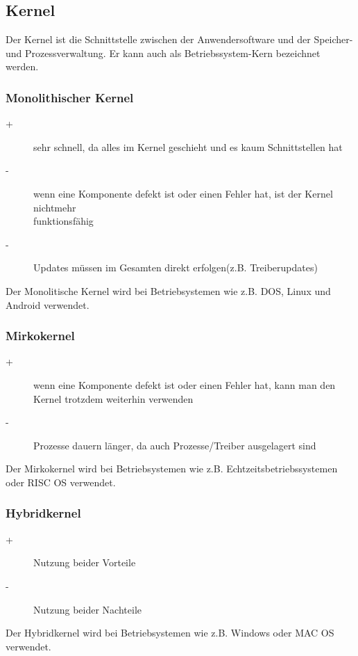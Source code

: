 \documentclass[12pt,a4paper]{article}
\begin{document}
\subsection{Kernel}
    Der Kernel ist die Schnittstelle zwischen der Anwendersoftware und der Speicher- und Prozessverwaltung. Er kann auch als Betriebssystem-Kern bezeichnet werden.

\subsubsection{Monolithischer Kernel}
	\begin{description}
    	\item[+]{sehr schnell, da alles im Kernel geschieht und es kaum Schnittstellen hat}
    	\item[-]{wenn eine Komponente defekt ist oder einen Fehler hat, ist der Kernel nichtmehr \\ funktionsfähig}
    	\item[-]{Updates müssen im Gesamten direkt erfolgen(z.B. Treiberupdates)}
	\end{description}
    Der Monolitische Kernel wird bei Betriebsystemen wie z.B. DOS, Linux und Android verwendet.

\subsubsection{Mirkokernel}
	\begin{description}
    	\item[+]{wenn eine Komponente defekt ist oder einen Fehler hat, kann man den Kernel trotzdem weiterhin 							 verwenden}
    	\item[-]{Prozesse dauern länger, da auch Prozesse/Treiber ausgelagert sind}
	\end{description}
    Der Mirkokernel wird bei Betriebsystemen wie z.B. Echtzeitsbetriebssystemen oder RISC OS verwendet.

\subsubsection{Hybridkernel}
	\begin{description}
    	\item[+]{Nutzung beider Vorteile}
    	\item[-]{Nutzung beider Nachteile}
	\end{description}
    Der Hybridkernel wird bei Betriebsystemen wie z.B. Windows oder MAC OS verwendet.
\end{document}
